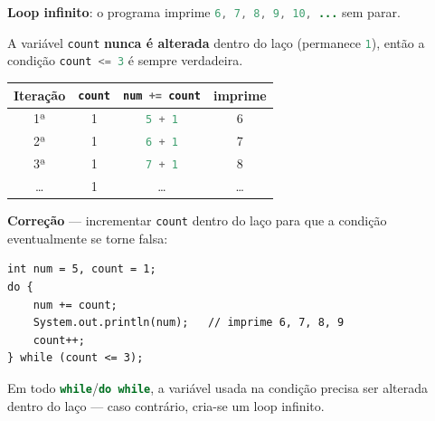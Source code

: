 \documentclass[12pt,a4paper]{article}
\newcommand{\codigo}[1]{\lstinline[language=Java,basicstyle=\ttfamily\small]|#1|}
\begin{document}
\begin{resolucao}
\textbf{Loop infinito}: o programa imprime \codigo{6, 7, 8, 9, 10, ...} sem parar.

A variável \codigo{count} \textbf{nunca é alterada} dentro do laço (permanece
\codigo{1}), então a condição \codigo{count <= 3} é sempre verdadeira.

\begin{center}
\begin{tabular}{c c c c}
  \hline
  Iteração & \codigo{count} & \codigo{num += count} & imprime \\
  \hline
  1ª & 1 & \codigo{5 + 1} & 6 \\
  2ª & 1 & \codigo{6 + 1} & 7 \\
  3ª & 1 & \codigo{7 + 1} & 8 \\
  \ldots & 1 & \ldots & \ldots \\
  \hline
\end{tabular}
\end{center}

\textbf{Correção} --- incrementar \codigo{count} dentro do laço para que a
condição eventualmente se torne falsa:

\begin{lstlisting}
int num = 5, count = 1;
do {
    num += count;
    System.out.println(num);   // imprime 6, 7, 8, 9
    count++;
} while (count <= 3);
\end{lstlisting}
\end{resolucao}

\begin{observacao}
Em todo \codigo{while}/\codigo{do while}, a variável usada na condição precisa ser
alterada dentro do laço --- caso contrário, cria-se um loop infinito.
\end{observacao}
\end{document}
